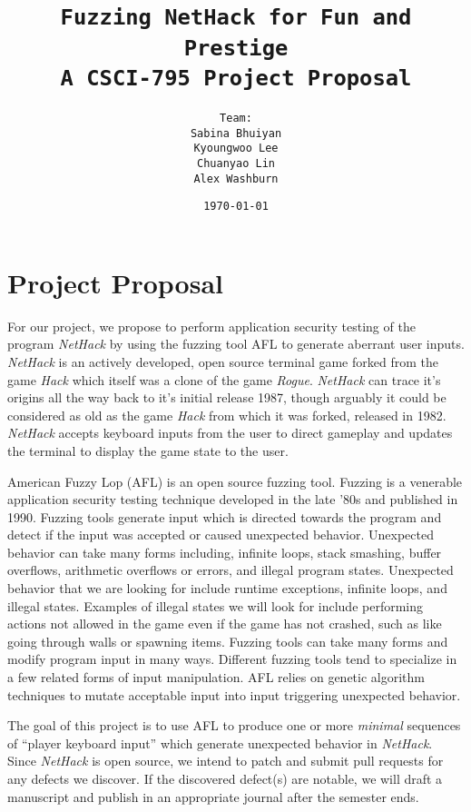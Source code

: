 \documentclass[12pt]{diazessay}
\title{\texttt{\huge{Fuzzing NetHack for Fun and Prestige} \\ {\large A CSCI-795 Project Proposal}}} %
\author{\texttt{{\Huge Team:}\\\vspace*{-0.5em} 
		Sabina Bhuiyan \\\vspace*{-0.5em} 
		Kyoungwoo Lee \\\vspace*{-0.5em}
		Chuanyao Lin \\\vspace*{-0.25em}
		Alex Washburn}} %
\date{\texttt{\today}} %
\begin{document}
\maketitle %

\section*{Project Proposal}

For our project, we propose to perform application security testing of the program \emph{NetHack} \cite{NetHack_page} by using the fuzzing tool AFL \cite{AFL_page} to generate aberrant user inputs. 
\emph{NetHack} is an actively developed, open source terminal game forked from the game \emph{Hack} which itself was a clone of the game \emph{Rogue}. 
\emph{NetHack} can trace it's origins all the way back to it's initial release 1987, though arguably it could be considered as old as the game \emph{Hack} from which it was forked, released in 1982. 
\emph{NetHack} accepts keyboard inputs from the user to direct gameplay and updates the terminal to display the game state to the user.

American Fuzzy Lop (AFL) is an open source fuzzing tool.
Fuzzing is a venerable application security testing technique developed in the late '80s and published in 1990.
Fuzzing tools generate input which is directed towards the program and detect if the input was accepted or caused unexpected behavior.
Unexpected behavior can take many forms including, infinite loops, stack smashing, buffer overflows, arithmetic overflows or errors, and illegal program states.
Unexpected behavior that we are looking for include runtime exceptions, infinite loops, and illegal states.
Examples of illegal states we will look for include performing actions not allowed in the game even if the game has not crashed, such as like going through walls or spawning items.
Fuzzing tools can take many forms and modify program input in many ways.
Different fuzzing tools tend to specialize in a few related forms of input manipulation.
AFL relies on genetic algorithm techniques to mutate acceptable input into input triggering unexpected behavior.

The goal of this project is to use AFL to produce one or more \emph{minimal} sequences of ``player keyboard input'' which generate unexpected behavior in \emph{NetHack}.
Since \emph{NetHack} is open source, we intend to patch and submit pull requests for any defects we discover.
If the discovered defect(s) are notable, we will draft a manuscript and publish in an appropriate journal after the semester ends.
\end{document}
